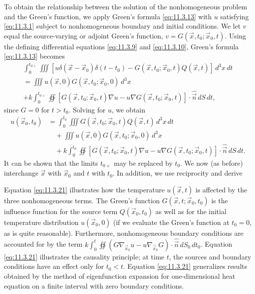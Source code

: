 To obtain the relationship between the solution of the nonhomogeneous problem and the Green's function, we apply Green's formula \eqref{eq:11.3.13} with $u$ satisfying \eqref{eq:11.3.1} subject to nonhomogeneous boundary and initial conditions.  We let $v$ equal the source-varying or adjoint Green's function, $v = G(\vec{x},t_0;\vec{x}_0,t)$.  Using the defining differential equations \eqref{eq:11.3.9} and \eqref{eq:11.3.10}, Green's formula \eqref{eq:11.3.13} becomes
\begin{multline*}
\int_0^{t_{0+}} \iiint [u\delta(\vec{x} - \vec{x}_0)\delta(t - t_0) - G(\vec{x},t_0;\vec{x}_0,t)Q(\vec{x},t)]\,d^3x\,dt \\
= \iiint u(\vec{x},0)G(\vec{x},t_0;\vec{x}_0,0)\,d^3x \\
+ k \int_0^{t_{0+}} \oiint [G(\vec{x},t_0;\vec{x}_0,t)\nabla u - u\nabla G(\vec{x},t_0;\vec{x}_0,t)]\cdot\hat{\vec{n}}\,dS\,dt,
\end{multline*}
since $G = 0$ for $t > t_0$.  Solving for $u$, we obtain
\begin{align*}
u(\vec{x}_0,t_0) &= \int_0^{t_0} \iiint G(\vec{x},t_0;\vec{x}_0,t)Q(\vec{x},t)\,d^3x\,dt \\
&\quad + \iiint u(\vec{x},0)G(\vec{x},t_0;\vec{x}_0,0)\,d^3x \\
&\quad + k \int_0^{t_0} \oiint [G(\vec{x},t_0;\vec{x}_0,t)\nabla u - u\nabla G(\vec{x},t_0;\vec{x}_0,t)]\cdot\hat{\vec{n}}\,dS\,dt.
\end{align*}
It can be shown that the limits $t_{0+}$ may be replaced by $t_0$.  We now (as before) interchange $\vec{x}$ with $\vec{x}_0$ and $t$ with $t_0$.  In addition, we use reciprocity and derive

Equation \eqref{eq:11.3.21} illustrates how the temperature $u(\vec{x},t)$ is affected by the three nonhomogeneous terms.  The Green's function $G(\vec{x},t;\vec{x}_0,t_0)$ is the influence function for the source term $Q(\vec{x}_0,t_0)$ as well as for the initial temperature distribution $u(\vec{x}_0,0)$ (if we evaluate the Green's function at $t_0 = 0$, as is quite reasonable).  Furthermore, nonhomogeneous boundary conditions are accounted for by the term $k\int_0^t \oiint (G\nabla_{\vec{x}_0} u - u\nabla_{\vec{x}_0} G)\cdot\hat{\vec{n}}\,dS_0\,dt_0$.  Equation \eqref{eq:11.3.21} illustrates the causality principle; at time $t$, the sources and boundary conditions have an effect only for $t_0 < t$.  Equation \eqref{eq:11.3.21} generalizes results obtained by the method of eigenfunction expansion for one-dimensional heat equation on a finite interval with zero boundary conditions.

